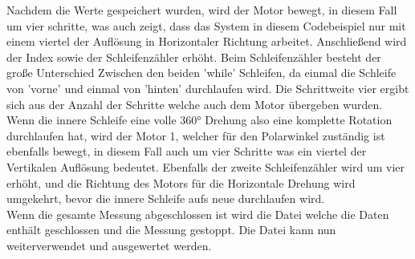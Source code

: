 Nachdem die Werte gespeichert wurden, wird der Motor bewegt, in diesem Fall um vier schritte, was auch zeigt, dass das System in diesem Codebeispiel nur mit einem viertel der Auflösung in Horizontaler Richtung arbeitet. Anschließend wird der Index sowie der Schleifenzähler erhöht. Beim Schleifenzähler besteht der große Unterschied Zwischen den beiden 'while' Schleifen, da einmal die Schleife von 'vorne' und einmal von 'hinten' durchlaufen wird. Die Schrittweite vier ergibt sich aus der Anzahl der Schritte welche auch dem Motor übergeben wurden.\\
Wenn die innere Schleife eine volle 360° Drehung also eine komplette Rotation durchlaufen hat, wird der Motor 1, welcher für den Polarwinkel zuständig ist ebenfalls bewegt, in diesem Fall auch um vier Schritte was ein viertel der Vertikalen Auflösung bedeutet. Ebenfalls der zweite Schleifenzähler wird um vier erhöht, und die Richtung des Motors für die Horizontale Drehung wird umgekehrt, bevor die innere Schleife aufs neue durchlaufen wird.\\
Wenn die gesamte Messung abgeschlossen ist wird die Datei welche die Daten enthält geschlossen und die Messung gestoppt. Die Datei kann nun weiterverwendet und ausgewertet werden.
